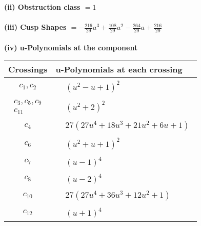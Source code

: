 \documentclass[1p]{elsarticle_modified}
\theoremstyle{definition}
\begin{document}
\flushleft \textbf{(ii) Obstruction class $= 1$}\\~\\
\flushleft \textbf{(iii) Cusp Shapes $= -\frac{216}{29} a^3+\frac{108}{29} a^2-\frac{264}{29} a+\frac{216}{29}$}\\~\\
\newpage\renewcommand{\arraystretch}{1}
\flushleft \textbf{(iv) u-Polynomials at the component}\newline \\
\begin{tabular}{m{50pt}|m{274pt}}
Crossings & \hspace{64pt}u-Polynomials at each crossing \\
\hline $$\begin{aligned}c_{1},c_{2}\end{aligned}$$&$\begin{aligned}
&(u^2- u+1)^2
\end{aligned}$\\
\hline $$\begin{aligned}c_{3},c_{5},c_{9}\\c_{11}\end{aligned}$$&$\begin{aligned}
&(u^2+2)^2
\end{aligned}$\\
\hline $$\begin{aligned}c_{4}\end{aligned}$$&$\begin{aligned}
&27(27 u^4+18 u^3+21 u^2+6 u+1)
\end{aligned}$\\
\hline $$\begin{aligned}c_{6}\end{aligned}$$&$\begin{aligned}
&(u^2+u+1)^2
\end{aligned}$\\
\hline $$\begin{aligned}c_{7}\end{aligned}$$&$\begin{aligned}
&(u-1)^4
\end{aligned}$\\
\hline $$\begin{aligned}c_{8}\end{aligned}$$&$\begin{aligned}
&(u-2)^4
\end{aligned}$\\
\hline $$\begin{aligned}c_{10}\end{aligned}$$&$\begin{aligned}
&27(27 u^4+36 u^3+12 u^2+1)
\end{aligned}$\\
\hline $$\begin{aligned}c_{12}\end{aligned}$$&$\begin{aligned}
&(u+1)^4
\end{aligned}$\\
\hline
\end{tabular}\\~\\
\end{document}
